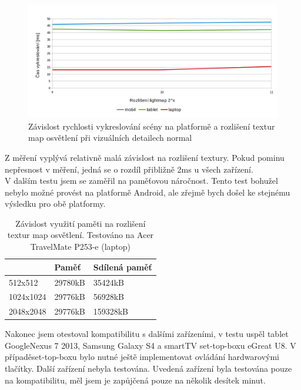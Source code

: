 \documentclass[11pt,twoside,a4paper]{book}
\begin{document}
\begin{figure}[h!]
\includegraphics[width=150mm]{figures/graf1.png}
\caption{Závislost rychlosti vykreslování scény na platformě a rozlišení textur map osvětlení při vizuálních detailech normal}
\end{figure}

Z měření vyplývá relativně malá závislost na rozlišení textury. Pokud pominu nepřesnost v měření, jedná se o rozdíl přibližně 2ms u všech zařízení.
\\

V dalším testu jsem se zaměřil na paměťovou náročnost. Tento test bohužel nebylo možné provést na platformě Android, ale zřejmě bych došel ke stejnému výsledku pro obě platformy.

\begin{table}[h!]
\begin{center}
\begin{tabular}{|p{35mm}|p{35mm}|p{35mm}|}
\hline
& \textbf{Paměť} & \textbf{Sdílená paměť} \\
\hline
512x512 & 29780kB & 35424kB \\ \hline
1024x1024 & 29776kB & 56928kB \\ \hline
2048x2048 & 29776kB & 159328kB \\ \hline
\end{tabular}
\caption{Závislost využití paměti na rozlišení textur map osvětlení. Testováno na Acer TravelMate P253-e (laptop)}
\end{center}
\end{table}
\pagebreak

Nakonec jsem otestoval kompatibilitu s dalšími zařízeními, v testu uspěl tablet Google\linebreak Nexus 7 2013, Samsung Galaxy S4 a smartTV set-top-boxu eGreat U8. V případě\linebreak set-top-boxu bylo nutné ještě implementovat ovládání hardwarovými tlačítky. Další zařízení nebyla testována. Uvedená zařízení byla testována pouze na kompatibilitu, měl jsem je zapůjčená pouze na několik desítek minut.
\end{document}
